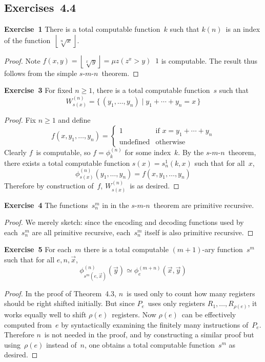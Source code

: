 \documentclass[letterpaper]{article}
\newcommand{\exercise}[2][]{\noindent\textbf{Exercise~{#2}}\ifthenelse{\isempty{#1}}{\textbf{.}}{ ({#1})\textbf{.}}}
\newcommand{\tminus}{\mathop{\overset{.}{-}}}
\newcommand{\floor}[1]{\left\lfloor{#1}\right\rfloor}
\newcommand{\smn}{$s$-$m$-$n$}
\theoremstyle{plain}
\theoremstyle{definition}
\theoremstyle{remark}
\begin{document}
\subsection*{Exercises~4.4}
\exercise{1}
There is a total computable function~$k$ such that $k(n)$~is an index of the function~$\floor{\sqrt[n]{x}}$.
\begin{proof}
Note $f(x,y)=\floor{\sqrt[x]{y}}=\mu z(z^x>y)\tminus 1$ is computable. The result thus follows from the simple \smn\ theorem.
\end{proof}

\exercise{3}
For fixed $n\ge1$, there is a total computable function~$s$ such that
$$W_{s(x)}^{(n)}=\{\,(y_1,\ldots,y_n)\mid y_1+\cdots+y_n=x\,\}$$
\begin{proof}
Fix $n\ge1$ and define
$$f(x,y_1,\ldots,y_n)=\begin{cases}
1&\text{if }x=y_1+\cdots+y_n\\
\text{undefined}&\text{otherwise}
\end{cases}$$
Clearly $f$~is computable, so $f=\phi_k^{(n)}$ for some index~$k$. By the \smn\ theorem, there exists a total computable function $s(x)=s_n^1(k,x)$ such that for all~$x$,
$$\phi_{s(x)}^{(n)}(y_1,\ldots,y_n)=f(x,y_1,\ldots,y_n)$$
Therefore by construction of~$f$, $W_{s(x)}^{(n)}$~is as desired.
\end{proof}

\exercise{4}
The functions~$s^m_n$ in in the \smn\ theorem are primitive recursive.
\begin{proof}
We merely sketch: since the encoding and decoding functions used by each~$s^m_n$ are all primitive recursive, each~$s^m_n$ itself is also primitive recursive.
\end{proof}

\exercise[\smn\ theorem]{5} For each~$m$ there is a total computable $(m+1)$-ary function~$s^m$ such that for all $e,n,\vec{x}$,
$$\phi_{s^m(e,\vec{x})}^{(n)}(\vec{y})\simeq\phi_e^{(m+n)}(\vec{x},\vec{y})$$
\begin{proof}
In the proof of Theorem~4.3, $n$~is used only to count how many registers should be right shifted initially. But since $P_e$~uses only registers $R_1,\ldots,R_{\rho(e)}$, it works equally well to shift $\rho(e)$~registers. Now $\rho(e)$~can be effectively computed from~$e$ by syntactically examining the finitely many instructions of~$P_e$. Therefore $n$~is not needed in the proof, and by constructing a similar proof but using~$\rho(e)$ instead of~$n$, one obtains a total computable function~$s^m$ as desired.
\end{proof}
\end{document}
